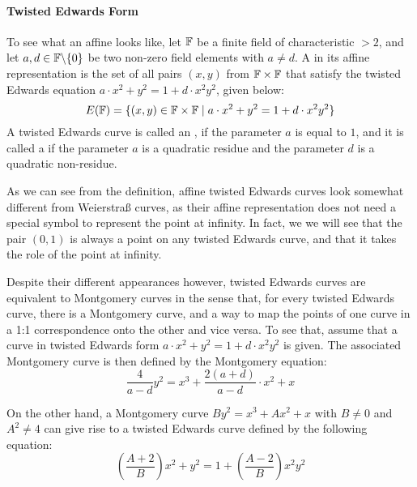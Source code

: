 \paragraph{Twisted Edwards Form}
To see what an affine  looks like, let $\mathbb{F}$ be a finite field of characteristic $>2$, and let $a,d\in \mathbb{F}\backslash\{0\}$ be two non-zero field elements with $a\neq d$.  A  in its affine representation is the set of all pairs $(x,y)$ from $\mathbb{F}\times \mathbb{F}$ that satisfy the twisted Edwards equation $a\cdot x^2+y^2= 1+d\cdot x^2y^2$, given below:
\begin{equation}
E(\mathbb{F})=\{(x,y)\in\mathbb{F}\times\mathbb{F}\;|\; a\cdot x^2+y^2= 1+d\cdot x^2y^2\}
\end{equation} 
A twisted Edwards curve is called an , if the parameter $a$ is equal to $1$, and it is called a  if the parameter $a$ is a quadratic residue and the parameter $d$ is a quadratic non-residue.

As we can see from the definition, affine twisted Edwards curves look somewhat different from Weierstraß curves, as their affine representation does not need a special symbol to represent the point at infinity. In fact, we we will see that the pair $(0,1)$ is always a point on any twisted Edwards curve, and that it takes the role of the point at infinity.

Despite their different appearances however, twisted Edwards curves are equivalent to Montgomery curves in the sense that, for every twisted Edwards curve, there is a Montgomery curve, and a way to map the points of one curve in a 1:1 correspondence onto the other and vice versa. To see that, assume that a curve in twisted Edwards form $a\cdot x^2+y^2= 1+d\cdot x^2y^2$ is given. The associated Montgomery curve is then defined by the Montgomery equation:
\begin{equation}
\frac{4}{a-d} y^2 = x^3 + \frac{2(a+d)}{a-d}\cdot x^2 + x 
\end{equation}

On the other hand, a Montgomery curve $By^{2}=x^{3}+Ax^{2}+x$ with $B\neq 0$ and $A^2\neq 4$ can give rise to a twisted Edwards curve defined by the following equation:
\begin{equation}\label{eq:montgomery-to-twisted-edwards}
(\frac{A+2}{B})x^2+y^2= 1+(\frac{A-2}{B})x^2y^2
\end{equation}

